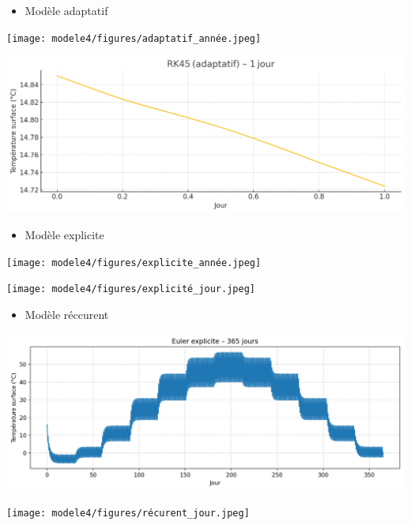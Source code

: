 \documentclass[a4paper,12pt]{article}
\begin{document}
\begin{itemize}
    \item Modèle adaptatif
\end{itemize}

\begin{center}
  \texttt{[image: modele4/figures/adaptatif\_année.jpeg]}
  \end{center}
\begin{center}
  \includegraphics[width=0.8\linewidth]{modele4/figures/adaptatif_jour.jpeg}
  \end{center}
\begin{itemize}
    \item Modèle explicite
\end{itemize}


\begin{center}
  \texttt{[image: modele4/figures/explicite\_année.jpeg]}
  \end{center}
\begin{center}
  \texttt{[image: modele4/figures/explicité\_jour.jpeg]}
  \end{center}
\begin{itemize}
    \item Modèle réccurent
\end{itemize}

\begin{center}
  \includegraphics[width=0.8\linewidth]{modele4/figures/récurrent_année.jpeg}
  \end{center}
\begin{center}
  \texttt{[image: modele4/figures/récurent\_jour.jpeg]}
  \end{center}
\vspace{1cm}
\end{document}
